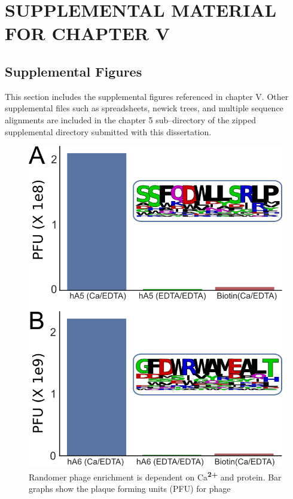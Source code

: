 \chapter{SUPPLEMENTAL MATERIAL FOR CHAPTER V}

\section{Supplemental Figures}
This section includes the supplemental figures referenced in chapter V. Other supplemental files such as spreadsheets, newick trees, and multiple sequence alignments are included in the chapter 5 sub--directory of the zipped supplemental directory submitted with this dissertation.

\begin{figure}
\centering
	\includegraphics{ch5-figS1.png} 
\caption[Randomer phage enrichment is dependent on Ca\textsuperscript{\textbf{2+}}
and protein]{Randomer phage enrichment is dependent on Ca\textsuperscript{\textbf{2+}}
and protein. Bar graphs show the plaque forming units (PFU) for phage
}
\end{figure}
